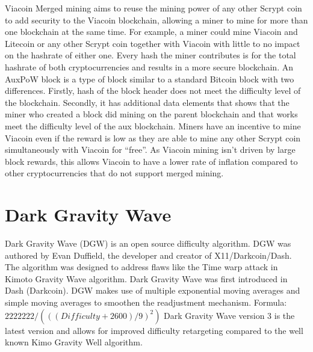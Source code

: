 \documentclass{article}
\begin{document}
Viacoin \cite{auxpow}Merged mining aims to reuse the mining power of any other \cite{scrypt}Scrypt coin
to add security to the Viacoin blockchain,
allowing a miner to mine for more than one blockchain at the same time. For example, a miner
could mine Viacoin and Litecoin or any other Scrypt coin together with Viacoin with little to no impact on the hashrate of either one.
\newline \newline \noindent
Every hash the miner contributes is for the total hashrate of both
cryptocurrencies and results in a more secure blockchain.
An AuxPoW block is a type of block similar to a standard Bitcoin block with two
differences. Firstly, hash of the block header does not meet the difficulty level of the
blockchain. Secondly, it has additional data elements that shows that the miner
who created a block did mining on the parent blockchain and that works meet
the difficulty level of the aux blockchain. 
\newline \newline \noindent
Miners have an incentive to mine Viacoin
even if the reward is low as they are able to mine any other Scrypt
coin simultaneously with Viacoin for “free”. As Viacoin mining isn't driven by large block rewards,
this allows Viacoin to have a lower rate of inflation
compared to other cryptocurrencies that do not support merged mining.
\newpage

\section{Dark Gravity Wave}\label{sec: Dark Gravity Wave}
\cite{darkGravityWave}Dark Gravity Wave (DGW) is an open source difficulty algorithm. DGW was
authored by Evan Duffield, the developer and creator of X11/Darkcoin/Dash.
The algorithm was designed to address flaws like the Time warp attack in Kimoto
Gravity Wave algorithm. 
\newline \newline \noindent
Dark Gravity Wave was first introduced in Dash
(Darkcoin). DGW makes use of multiple exponential moving averages and simple
moving averages to smoothen the readjustment mechanism.
\newline Formula: \newline \newline
$2222222/ (((Difficulty+2600)/9)^2)$ \newline \newline \noindent
Dark Gravity Wave version 3 is the latest version and allows for improved difficulty retargeting compared
to the well known Kimo Gravity Well algorithm.
\end{document}
